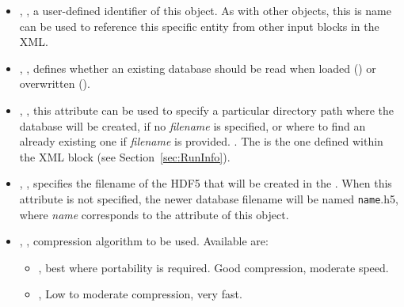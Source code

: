 \begin{itemize}
  \itemsep0em
  \item {}, , a user-defined
  identifier of this object.
  \nb As with other objects, this is name can be used to reference this specific
  entity from other input blocks in the XML.
  \item {}, , defines whether an existing database should
    be read when loaded () or overwritten ().
  \item {}, , this attribute
  can be used to specify a particular directory path where the database will be
  created, if no \textit{filename} is specified, or where to find an already
  existing one if \textit{filename} is provided.
  .  The  is
   the one defined within the  XML block (see Section~\ref{sec:RunInfo}).
  \item {}, , specifies the
  filename of the HDF5 that will be created in the  .
  \nb When this attribute is not specified, the newer database filename will be
  named \texttt{name}.h5, where \textit{name} corresponds to the 
  attribute of this object.
  \item {}, , compression
  algorithm to be used.
  Available are:
  \begin{itemize}
    \item {}, best where portability is required.
    Good compression, moderate speed.
    \item {}, Low to moderate compression, very fast.
  \end{itemize}
\end{itemize}

